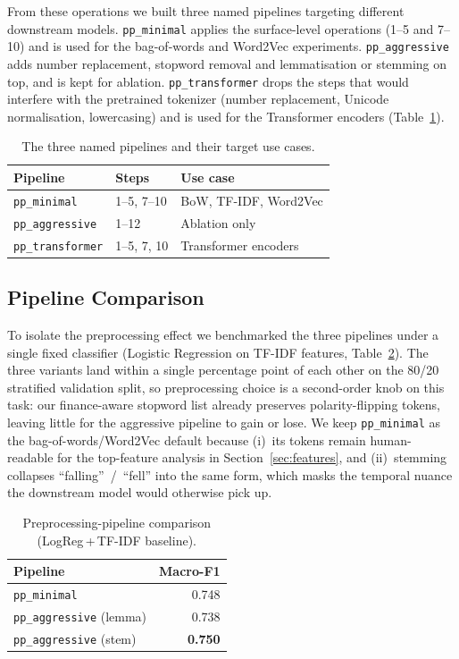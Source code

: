 \documentclass[12pt,a4paper]{article}
\begin{document}
From these operations we built three named pipelines targeting different downstream models. \texttt{pp\_minimal} applies the surface-level operations (1--5 and 7--10) and is used for the bag-of-words and Word2Vec experiments. \texttt{pp\_aggressive} adds number replacement, stopword removal and lemmatisation or stemming on top, and is kept for ablation. \texttt{pp\_transformer} drops the steps that would interfere with the pretrained tokenizer (number replacement, Unicode normalisation, lowercasing) and is used for the Transformer encoders (Table~\ref{tab:pipelines}).

\begin{table}[!htbp]
\centering
\begin{tabular}{llp{6cm}}
\toprule
\textbf{Pipeline} & \textbf{Steps} & \textbf{Use case} \\
\midrule
\texttt{pp\_minimal}     & 1--5, 7--10 & BoW, TF-IDF, Word2Vec \\
\texttt{pp\_aggressive}  & 1--12       & Ablation only \\
\texttt{pp\_transformer} & 1--5, 7, 10 & Transformer encoders \\
\bottomrule
\end{tabular}
\caption{The three named pipelines and their target use cases.}
\label{tab:pipelines}
\end{table}

\subsection{Pipeline Comparison}

To isolate the preprocessing effect we benchmarked the three pipelines under a single fixed classifier (Logistic Regression on TF-IDF features, Table~\ref{tab:pp_compare}). The three variants land within a single percentage point of each other on the 80/20 stratified validation split, so preprocessing choice is a second-order knob on this task: our finance-aware stopword list already preserves polarity-flipping tokens, leaving little for the aggressive pipeline to gain or lose. We keep \texttt{pp\_minimal} as the bag-of-words/Word2Vec default because (i)~its tokens remain human-readable for the top-feature analysis in Section~\ref{sec:features}, and (ii)~stemming collapses ``falling''~/~``fell'' into the same form, which masks the temporal nuance the downstream model would otherwise pick up.

\begin{table}[!htbp]
\centering
\begin{tabular}{lr}
\toprule
\textbf{Pipeline} & \textbf{Macro-F1} \\
\midrule
\texttt{pp\_minimal}              & 0.748 \\
\texttt{pp\_aggressive} (lemma)   & 0.738 \\
\texttt{pp\_aggressive} (stem)    & \textbf{0.750} \\
\bottomrule
\end{tabular}
\caption{Preprocessing-pipeline comparison (LogReg\,+\,TF-IDF baseline).}
\label{tab:pp_compare}
\end{table}
\end{document}

